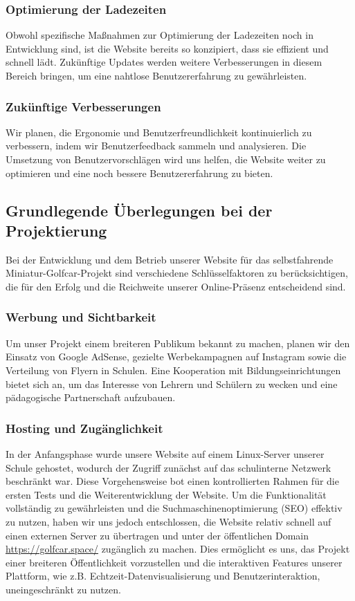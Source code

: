 \subsubsection{Optimierung der Ladezeiten}
Obwohl spezifische Maßnahmen zur Optimierung der Ladezeiten noch in Entwicklung sind, ist die Website bereits so konzipiert, dass sie effizient und schnell lädt. Zukünftige Updates werden weitere Verbesserungen in diesem Bereich bringen, um eine nahtlose Benutzererfahrung zu gewährleisten.

\subsubsection{Zukünftige Verbesserungen}
Wir planen, die Ergonomie und Benutzerfreundlichkeit kontinuierlich zu verbessern, indem wir Benutzerfeedback sammeln und analysieren. Die Umsetzung von Benutzervorschlägen wird uns helfen, die Website weiter zu optimieren und eine noch bessere Benutzererfahrung zu bieten.

\subsection{Grundlegende Überlegungen bei der Projektierung}

Bei der Entwicklung und dem Betrieb unserer Website für das selbstfahrende Miniatur-Golfcar-Projekt sind verschiedene Schlüsselfaktoren zu berücksichtigen, die für den Erfolg und die Reichweite unserer Online-Präsenz entscheidend sind.

\subsubsection{Werbung und Sichtbarkeit}

Um unser Projekt einem breiteren Publikum bekannt zu machen, planen wir den Einsatz von Google AdSense, gezielte Werbekampagnen auf Instagram sowie die Verteilung von Flyern in Schulen. Eine Kooperation mit Bildungseinrichtungen bietet sich an, um das Interesse von Lehrern und Schülern zu wecken und eine pädagogische Partnerschaft aufzubauen.

\subsubsection{Hosting und Zugänglichkeit}

In der Anfangsphase wurde unsere Website auf einem Linux-Server unserer Schule gehostet, wodurch der Zugriff zunächst auf das schulinterne Netzwerk beschränkt war. Diese Vorgehensweise bot einen kontrollierten Rahmen für die ersten Tests und die Weiterentwicklung der Website. Um die Funktionalität vollständig zu gewährleisten und die Suchmaschinenoptimierung (SEO) effektiv zu nutzen, haben wir uns jedoch entschlossen, die Website relativ schnell auf einen externen Server zu übertragen und unter der öffentlichen Domain \url{https://golfcar.space/} zugänglich zu machen. Dies ermöglicht es uns, das Projekt einer breiteren Öffentlichkeit vorzustellen und die interaktiven Features unserer Plattform, wie z.B. Echtzeit-Datenvisualisierung und Benutzerinteraktion, uneingeschränkt zu nutzen.

